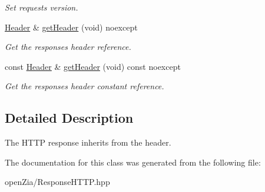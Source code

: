\begin{DoxyCompactItemize}
\begin{DoxyCompactList}\small\item\em Set request\textquotesingle{}s version. \end{DoxyCompactList}\item 
\mbox{\label{classo_z_1_1o_z_1_1_h_t_t_p_1_1_response_a38279a872d9c2c731fc43493995afabe}} 
\mbox{\hyperlink{classo_z_1_1o_z_1_1_h_t_t_p_1_1_header}{Header}} \& \mbox{\hyperlink{classo_z_1_1o_z_1_1_h_t_t_p_1_1_response_a38279a872d9c2c731fc43493995afabe}{get\+Header}} (void) noexcept
\begin{DoxyCompactList}\small\item\em Get the response\textquotesingle{}s header reference. \end{DoxyCompactList}\item 
\mbox{\label{classo_z_1_1o_z_1_1_h_t_t_p_1_1_response_a231a5ff9942da0165e02aa718baf2e75}} 
const \mbox{\hyperlink{classo_z_1_1o_z_1_1_h_t_t_p_1_1_header}{Header}} \& \mbox{\hyperlink{classo_z_1_1o_z_1_1_h_t_t_p_1_1_response_a231a5ff9942da0165e02aa718baf2e75}{get\+Header}} (void) const noexcept
\begin{DoxyCompactList}\small\item\em Get the response\textquotesingle{}s header constant reference. \end{DoxyCompactList}\end{DoxyCompactItemize}


\subsection{Detailed Description}
The H\+T\+TP response inherits from the header. 

The documentation for this class was generated from the following file\+:\begin{DoxyCompactItemize}
\item 
open\+Zia/Response\+H\+T\+T\+P.\+hpp\end{DoxyCompactItemize}
